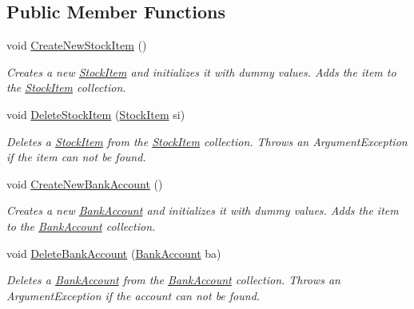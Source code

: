 \subsection*{Public Member Functions}
\begin{DoxyCompactItemize}
\item 
void \hyperlink{class_application_logic_1_1_model_1_1_app_data_manager_afb43e13b4f73d9dc2af1b0198df394d0}{CreateNewStockItem} ()
\begin{DoxyCompactList}\small\item\em Creates a new \hyperlink{class_application_logic_1_1_model_1_1_stock_item}{StockItem} and initializes it with dummy values. Adds the item to the \hyperlink{class_application_logic_1_1_model_1_1_stock_item}{StockItem} collection. \item\end{DoxyCompactList}\item 
void \hyperlink{class_application_logic_1_1_model_1_1_app_data_manager_ac529e92b640c1f6ca06b9c9a8bfaaf77}{DeleteStockItem} (\hyperlink{class_application_logic_1_1_model_1_1_stock_item}{StockItem} si)
\begin{DoxyCompactList}\small\item\em Deletes a \hyperlink{class_application_logic_1_1_model_1_1_stock_item}{StockItem} from the \hyperlink{class_application_logic_1_1_model_1_1_stock_item}{StockItem} collection. Throws an ArgumentException if the item can not be found. \item\end{DoxyCompactList}\item 
void \hyperlink{class_application_logic_1_1_model_1_1_app_data_manager_a6ea600a1df3f50f6167a8c97a69244bd}{CreateNewBankAccount} ()
\begin{DoxyCompactList}\small\item\em Creates a new \hyperlink{class_application_logic_1_1_model_1_1_bank_account}{BankAccount} and initializes it with dummy values. Adds the item to the \hyperlink{class_application_logic_1_1_model_1_1_bank_account}{BankAccount} collection. \item\end{DoxyCompactList}\item 
void \hyperlink{class_application_logic_1_1_model_1_1_app_data_manager_a94061c92cc5a1d87c21e91bd2e8f0de2}{DeleteBankAccount} (\hyperlink{class_application_logic_1_1_model_1_1_bank_account}{BankAccount} ba)
\begin{DoxyCompactList}\small\item\em Deletes a \hyperlink{class_application_logic_1_1_model_1_1_bank_account}{BankAccount} from the \hyperlink{class_application_logic_1_1_model_1_1_bank_account}{BankAccount} collection. Throws an ArgumentException if the account can not be found. \item\end{DoxyCompactList}\item 

\end{DoxyCompactItemize}
